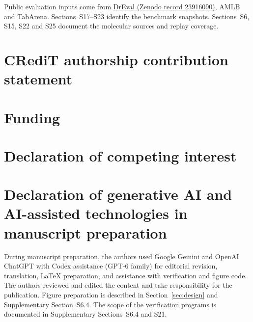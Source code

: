 \documentclass[preprint,12pt,number,sort&compress]{elsarticle}
\begin{document}
Public evaluation inputs come from \href{https://zenodo.org/records/23916090}{DrEval (Zenodo record 23916090)}, AMLB and TabArena. Sections~S17--S23 identify the benchmark snapshots. Sections~S6, S15, S22 and S25 document the molecular sources and replay coverage.

\section*{CRediT authorship contribution statement}
\AuthorContributions
\section*{Funding}
\FundingStatement
\section*{Declaration of competing interest}
\CompetingInterests
\section*{Declaration of generative AI and AI-assisted technologies in manuscript preparation}
During manuscript preparation, the authors used Google Gemini and OpenAI ChatGPT with Codex assistance (GPT-6 family) for editorial revision, translation, LaTeX preparation, and assistance with verification and figure code. The authors reviewed and edited the content and take responsibility for the publication. Figure preparation is described in Section~\ref{sec:design} and Supplementary Section~S6.4. The scope of the verification programs is documented in Supplementary Sections~S6.4 and S21.

\begingroup\small{}\setlength{\bibsep}{0pt}


\endgroup
\end{document}

